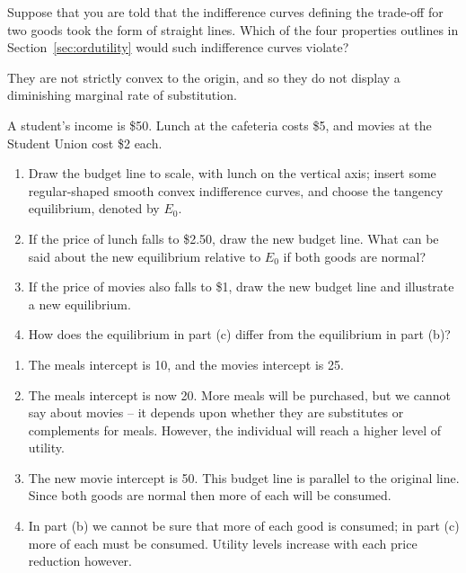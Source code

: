 \begin{enumialphparenastyle}
\begin{ex}\label{ex:ch6ex7}
Suppose that you are told that the indifference curves defining the trade-off for two goods took the form of straight lines. Which of the four properties outlines in Section~\ref{sec:ordutility} would such indifference curves violate?
\begin{sol}
	They are not strictly convex to the origin, and so they do not display a diminishing marginal rate of substitution.
	
\end{sol}
\end{ex}

\begin{ex}\label{ex:ch6ex8}
A student's income is \$50. Lunch at the cafeteria costs \$5, and movies at the Student Union cost \$2 each.
\begin{enumerate}
	\item	Draw the budget line to scale, with lunch on the vertical axis; insert some regular-shaped smooth convex indifference curves, and choose the tangency equilibrium, denoted by $E_0$. 
	\item	If the price of lunch falls to \$2.50, draw the new budget line. What can be said about the new equilibrium relative to $E_0$ if both goods are normal? 
	\item	If the price of movies also falls to \$1, draw the new budget line and illustrate a new equilibrium. 
	\item	How does the equilibrium in part (c) differ from the equilibrium in part (b)?
\end{enumerate}
\begin{sol}
\begin{enumerate}
	\item	The meals intercept is 10, and the movies intercept is 25.
	\item	The meals intercept is now 20. More meals will be purchased, but we cannot say about movies -- it depends upon whether they are substitutes or complements for meals. However, the individual will reach a higher level of utility.
	\item	The new movie intercept is 50. This budget line is parallel to the original line. Since both goods are normal then more of each will be consumed.
	\item	In part (b) we cannot be sure that more of each good is consumed; in part (c) more of each must be consumed. Utility levels increase with each price reduction however.
\end{enumerate}
\end{sol}
\end{ex}


\end{enumialphparenastyle}
